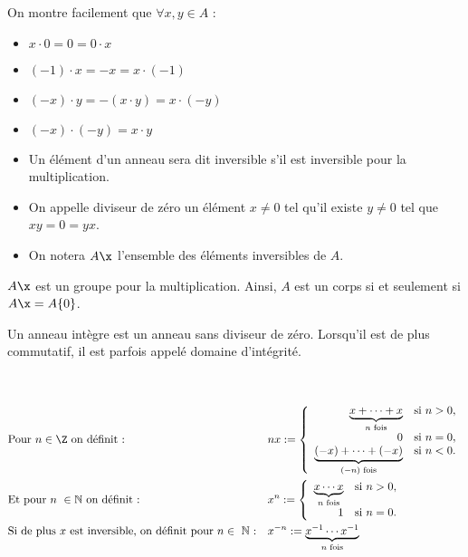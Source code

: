 \begin{example}[Remarques]

 On montre facilement que $\forall x,y \in A$ :
\begin{itemize}
 \item $x\cdotp 0 = 0  = 0\cdotp x$
 \item $(-1)\cdotp x = -x = x \cdotp (-1)$
 \item $(-x)\cdotp y  = -(x\cdotp y) = x \cdotp (-y)$
 \item $(-x) \cdotp (-y) = x\cdotp y$
\end{itemize}
\end{example}

\begin{defi}
\begin{itemize}
 \item Un élément d'un anneau sera dit inversible s'il est inversible pour la
multiplication.
\item On appelle diviseur de zéro un élément $x \neq 0$ tel qu'il existe $y\neq
0$ tel que $xy = 0 = yx$.
\item 
On notera $A\x$ l'ensemble des éléments inversibles de $A$.
\end{itemize}
\end{defi}

\begin{example}[Remarque]
 $A\x$ est un groupe pour la multiplication. Ainsi, $A$ est un corps si et
seulement si $A\x = A\-\{0\}$.
\end{example}

\begin{defi}

 Un anneau intègre est un anneau sans diviseur de zéro. Lorsqu'il est de plus
commutatif, il est parfois appelé domaine d'intégrité.
\end{defi}

\begin{example}[Notations]\ 


\begin{align*}
&\text{Pour $n \in \Z$ on définit : }& &
 nx := \left\{
\begin{array}{rl}
\underbrace{x + \cdots + x}_{n\text{ fois}} & \text{si } n > 0,\\
0 & \text{si } n = 0,\\
\underbrace{(-x) + \cdots + (-x)}_{(-n)\text{ fois}} & \text{si } n < 0.
\end{array} \right. \\
&\text{Et pour $n \in \mathbb{N}$ on définit : } & &
x^n := \left\{
\begin{array}{rl}
\underbrace{x \cdots x}_{n\text{ fois}} & \text{si } n > 0,\\
1 & \text{si } n = 0.
\end{array} \right.\\
&\text{Si de plus $x$ est inversible, on définit pour $n\in \mathbb{N}$ :}
& & x^{-n} := \underbrace{x^{-1} \cdots x^{-1}}_{n\text{ fois}} 
\end{align*}
\end{example}

